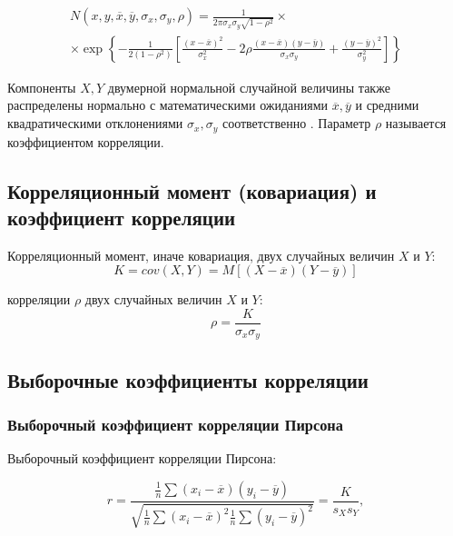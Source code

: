 \documentclass[12pt]{article}
\begin{document}
\begin{flushleft}
    \begin{multline}
            N(x, y, \overline{x}, \overline{y}, \sigma_x, \sigma_y, \rho) = \frac{1}{2\pi\sigma_x\sigma_y\sqrt{1 - \rho^2}} \times\\
            \times \exp\left\{ -\frac{1}{2(1 - \rho^2)} \left[ \frac{(x - \overline{x})^2}{\sigma_x^2} - 2\rho\frac{(x - \overline{x})(y - \overline{y})}{\sigma_x\sigma_y} + \frac{(y - \overline{y})^2}{\sigma_y^2}\right] \right\}
        \label{normal2}
    \end{multline}

    Компоненты $X, Y$ двумерной нормальной случайной величины также распределены нормально с математическими ожиданиями $\overline{x}, \overline{y}$ и средними квадратическими отклонениями $\sigma_x, \sigma_y$ соответственно \cite{theory1}. Параметр $\rho$ называется коэффициентом корреляции.

    \subsection{Корреляционный момент (ковариация) и коэффициент корреляции}
        Корреляционный момент, иначе ковариация, двух случайных величин $X$ и $Y$:
        \begin{equation}
            K = cov(X, Y) = M\left[(X-\overline{x})(Y-\overline{y})\right]
        \end{equation}

         корреляции $\rho$ двух случайных величин $X$ и $Y$:
        \begin{equation}
            \rho = \frac{K}{\sigma_x\sigma_y}
        \end{equation}    

    \subsection{Выборочные коэффициенты корреляции}
        \subsubsection{Выборочный коэффициент корреляции Пирсона}
            Выборочный коэффициент корреляции Пирсона:

            \begin{equation}
                r = \frac{\frac{1}{n} \sum (x_i - \overline{x})(y_i - \overline{y})}{\sqrt{\frac{1}{n} \sum (x_i - \overline{x})^2 \frac{1}{n} \sum (y_i - \overline{y})^2}} = \frac{K}{s_Xs_Y},
            \label{pirse}
            \end{equation}


\end{flushleft}
\end{document}
